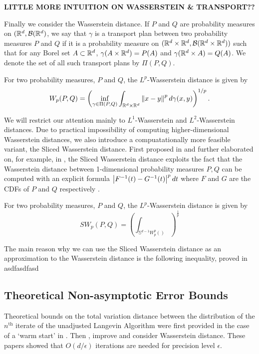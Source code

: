 \textbf{LITTLE MORE INTUITION ON WASSERSTEIN \& TRANSPORT??}

Finally we consider the Wasserstein distance.  If $P$ and $Q$ are probability measures on $(\mathbb{R}^d,\mathcal{B}(\mathbb{R}^d)$, we say that $\gamma$ is a transport plan between two probability measures $P$ and $Q$ if it is a probability measure on $(\mathbb{R}^d \times \mathbb{R}^d, \mathcal{B}(\mathbb{R}^d \times \mathbb{R}^d))$ such that for any Borel set $A \subset \mathbb{R}^d$, $\gamma(A \times \mathbb{R}^d)=P(A)$ and $\gamma(\mathbb{R}^d \times A) = Q(A)$.  We denote the set of all such transport plans by $\Pi(P,Q)$.

\begin{defn}
For two probability measures, $P$ and $Q$, the $L^p$-Wasserstein distance is given by
$$
W_p(P,Q) = \left( \inf_{\gamma \in \Pi(P,Q)} \int_{\R^d \times \R^d} \norm{x-y}^p d \gamma(x,y) \right)^{1/p}.
$$
\end{defn}

We will restrict our attention mainly to $L^1$-Wasserstein and $L^2$-Wasserstein distances. Due to practical impossibility of computing higher-dimensional Wasserstein distances, we also introduce a compuatationally more feasible variant, the Sliced Wasserstein distance. First proposed in \cite{rabin2011wasserstein} and further elaborated on, for example, in \cite{gswd}, the Sliced Wasserstein distance exploits the fact that the Wasserstein distance between 1-dimensional probability measures $P, Q$ can be computed with an explicit formula $\abs{F^{-1}(t)-G^{-1}(t)}^p dt$ where $F$ and $G$ are the CDFs of $P$ and $Q$ respectively \cite{ramdas2017wasserstein}.


\begin{defn}
For two probability measures, $P$ and $Q$, the $L^p$-Wasserstein distance is given by
$$
SW_p(P,Q) = \left(\int_{\mathbb S^{d-1} W_p^p() } \right)^{\frac 1 p}
$$
\end{defn}

The main reason why we can use the Sliced Wasserstein distance as an approximation to the Wasserstein distance is the following inequality, proved in asdfasdfasd 


\subsection{Theoretical Non-asymptotic Error Bounds}
Theoretical bounds on the total variation distance between the distribution of the $n^\text{th}$ iterate of the unadjusted Langevin Algorithm were first provided in the case of a `warm start' in \cite{dalalyan2017theoretical}.  Then \cite{durmus2016high}, \cite{durmus2017nonasymptotic} improve and consider Wasserstein distance.  These papers showed that $O(d/\epsilon)$ iterations are needed for precision level $\epsilon$.

